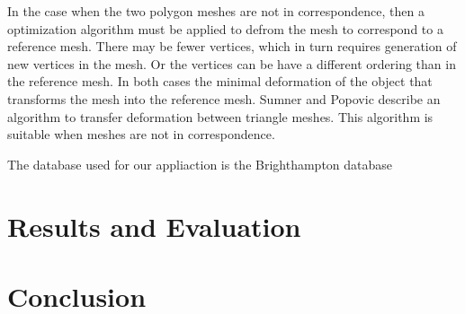\documentclass[11pt,a4paper]{report}
\begin{document}
In the case when the two polygon meshes are not in correspondence, then a
optimization algorithm must be applied to defrom the mesh to correspond to a
reference mesh. There may be fewer vertices, which in turn requires
generation of new vertices in the mesh. Or the vertices can be have a different
ordering than in the reference mesh. In both cases the minimal deformation of
the object that transforms the mesh into the reference mesh. Sumner and Popovic \cite{deformTri}
describe an algorithm to transfer deformation between triangle meshes. This
algorithm is suitable when meshes are not in correspondence.

The database used for our appliaction is the Brighthampton database

\chapter{Results and Evaluation}

\chapter{Conclusion}




\end{document}
